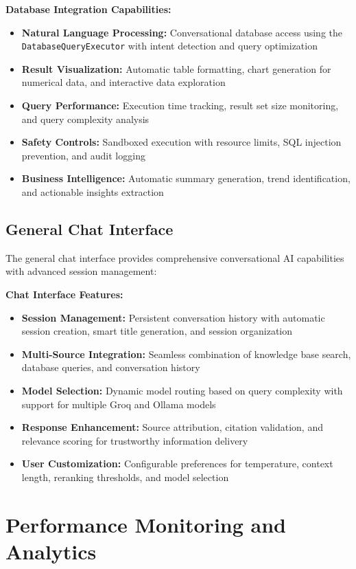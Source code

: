 \textbf{Database Integration Capabilities:}
\begin{itemize}
    \item \textbf{Natural Language Processing:} Conversational database access using the \texttt{DatabaseQueryExecutor} with intent detection and query optimization
    \item \textbf{Result Visualization:} Automatic table formatting, chart generation for numerical data, and interactive data exploration
    \item \textbf{Query Performance:} Execution time tracking, result set size monitoring, and query complexity analysis
    \item \textbf{Safety Controls:} Sandboxed execution with resource limits, SQL injection prevention, and audit logging
    \item \textbf{Business Intelligence:} Automatic summary generation, trend identification, and actionable insights extraction
\end{itemize}

\subsection{General Chat Interface}
\label{subsec:general_chat_s3}

The general chat interface provides comprehensive conversational AI capabilities with advanced session management:

\textbf{Chat Interface Features:}
\begin{itemize}
    \item \textbf{Session Management:} Persistent conversation history with automatic session creation, smart title generation, and session organization
    \item \textbf{Multi-Source Integration:} Seamless combination of knowledge base search, database queries, and conversation history
    \item \textbf{Model Selection:} Dynamic model routing based on query complexity with support for multiple Groq and Ollama models
    \item \textbf{Response Enhancement:} Source attribution, citation validation, and relevance scoring for trustworthy information delivery
    \item \textbf{User Customization:} Configurable preferences for temperature, context length, reranking thresholds, and model selection
\end{itemize}

\section{Performance Monitoring and Analytics}
\label{sec:performance_monitoring_s3}


